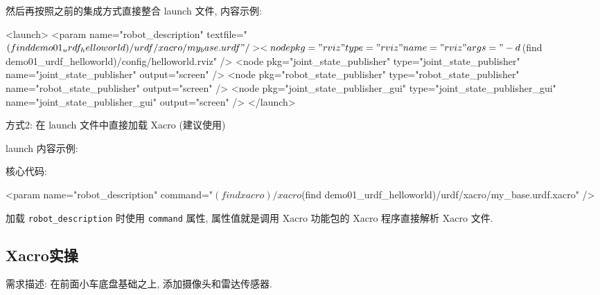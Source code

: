 \documentclass[openany, fontset=windowsold]{ctexbook}
\theoremstyle{kaiti}
\theoremstyle{normal}
\begin{document}
然后再按照之前的集成方式直接整合 launch 文件, 内容示例:

\begin{xml}
  <launch>
      <param name="robot_description" textfile="$(find demo01_urdf_helloworld)/urdf/xacro/my_base.urdf" />

      <node pkg="rviz" type="rviz" name="rviz" args="-d $(find demo01_urdf_helloworld)/config/helloworld.rviz" />
      <node pkg="joint_state_publisher" type="joint_state_publisher" name="joint_state_publisher" output="screen" />
      <node pkg="robot_state_publisher" type="robot_state_publisher" name="robot_state_publisher" output="screen" />
      <node pkg="joint_state_publisher_gui" type="joint_state_publisher_gui" name="joint_state_publisher_gui" output="screen" />
  </launch>
\end{xml}

方式2: 在 launch 文件中直接加载 Xacro (建议使用)

launch 内容示例:


核心代码:

\begin{xml}
  <param name="robot_description" command="$(find xacro)/xacro $(find demo01_urdf_helloworld)/urdf/xacro/my_base.urdf.xacro" />
\end{xml}

加载 \verb|robot_description| 时使用 \verb|command| 属性, 属性值就是调用 Xacro 功能包的 Xacro 程序直接解析 Xacro 文件.

\subsection{Xacro实操}

需求描述: 在前面小车底盘基础之上, 添加摄像头和雷达传感器.
\end{document}
